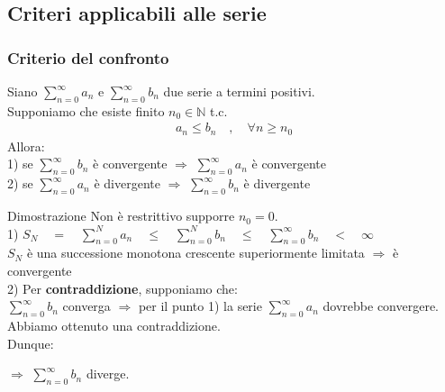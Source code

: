 \documentclass[x11names]{article}
\begin{document}
	\subsection{Criteri applicabili alle serie}
	
	\subsubsection{Criterio del confronto}
	Siano  $\sum_{n=0}^{\infty}a_n$ e $\sum_{n=0}^{\infty}b_n$ due serie a termini positivi. \\
	Supponiamo che esiste finito $n_0 \in \mathbb{N}$ t.c. 
	\[ 
	\begin{array}{ll}
		a_n \leq b_n \quad,\quad \forall n \geq n_0
	\end{array}
	\]
	Allora: \\
	
	1) se $\sum_{n=0}^{\infty}b_n$ è convergente $\Longrightarrow$ $\sum_{n=0}^{\infty}a_n$ è convergente\\
	
	2) se $\sum_{n=0}^{\infty}a_n$ è divergente $\Longrightarrow$ $\sum_{n=0}^{\infty}b_n$ è divergente \\
	
	\begin{es}{Dimostrazione}
		Non è restrittivo supporre $n_0 = 0$. \\
		
		1) $S_N \quad = \quad \sum_{n=0}^{N}a_n \quad\leq\quad  \sum_{n=0}^{N}b_n \quad\leq\quad  \sum_{n=0}^{\infty}b_n \quad < \quad \infty$ \\
		
		$S_N$ è una successione monotona crescente superiormente limitata $\Longrightarrow$ è convergente \\
		
		2) Per \textbf{contraddizione}, supponiamo che: \\
		
		$\sum_{n=0}^{\infty}b_n$ converga $\Longrightarrow$ per il punto 1) la serie  $\sum_{n=0}^{\infty}a_n$ dovrebbe convergere. \\ Abbiamo ottenuto una contraddizione. \\
		
		Dunque:
		\begin{center}
			$\Longrightarrow$  $\sum_{n=0}^{\infty}b_n$ diverge.
		\end{center}
		
	\end{es}
	
\end{document}
